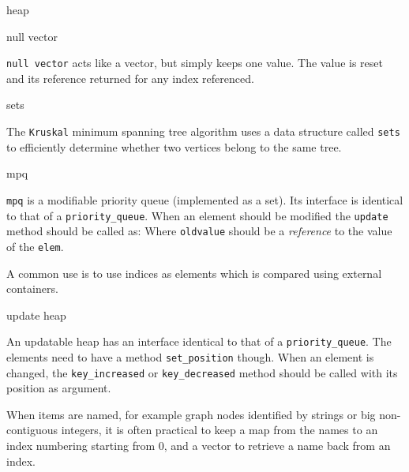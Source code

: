 \begin{algorithm}{heap}
\end{algorithm}

\begin{algorithm}{null vector}

\desc
{\tt null vector} acts like a vector, but simply keeps one value.
The value is reset and its reference returned for any index referenced.
\end{algorithm}

\begin{algorithm}{sets}

\desc
The {\tt Kruskal} minimum spanning tree algorithm uses a data structure
called {\tt sets} to efficiently determine whether two vertices belong to
the same tree.
\end{algorithm}

\begin{algorithm}{mpq}

\desc
{\tt mpq} is a modifiable priority queue (implemented as a set). Its interface
is identical to that of a {\tt priority\_queue}. When an element should be
modified the {\tt update} method should be called as:
Where {\tt oldvalue} should be a \emph{reference} to the value of the
{\tt elem}.

\desc
A common use is to use indices as elements which is compared using external
containers.
\end{algorithm}

\begin{algorithm}{update heap}

\desc
An updatable heap has an interface identical to that of a
{\tt priority\_queue}.
The elements need to have a method {\tt set\_position} though. When an element
is changed, the {\tt key\_increased} or {\tt key\_decreased} method should
be called with its position as argument.
\end{algorithm}

When items are named, for example graph nodes identified by strings or big
non-contiguous integers, it is often practical to keep a map from the
names to an index numbering starting from 0, and a vector to retrieve a name
back from an index.

